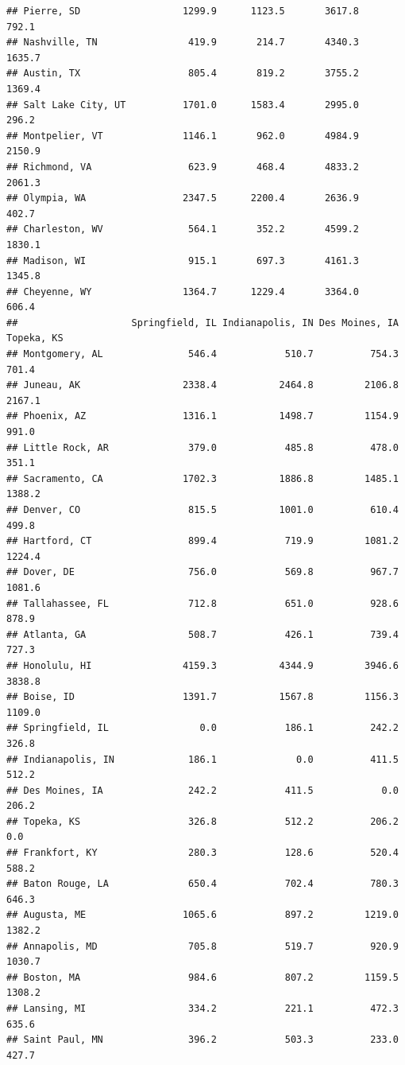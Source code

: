 \documentclass[
]{article}
\begin{document}
\begin{verbatim}
## Pierre, SD                  1299.9      1123.5       3617.8     792.1
## Nashville, TN                419.9       214.7       4340.3    1635.7
## Austin, TX                   805.4       819.2       3755.2    1369.4
## Salt Lake City, UT          1701.0      1583.4       2995.0     296.2
## Montpelier, VT              1146.1       962.0       4984.9    2150.9
## Richmond, VA                 623.9       468.4       4833.2    2061.3
## Olympia, WA                 2347.5      2200.4       2636.9     402.7
## Charleston, WV               564.1       352.2       4599.2    1830.1
## Madison, WI                  915.1       697.3       4161.3    1345.8
## Cheyenne, WY                1364.7      1229.4       3364.0     606.4
##                    Springfield, IL Indianapolis, IN Des Moines, IA Topeka, KS
## Montgomery, AL               546.4            510.7          754.3      701.4
## Juneau, AK                  2338.4           2464.8         2106.8     2167.1
## Phoenix, AZ                 1316.1           1498.7         1154.9      991.0
## Little Rock, AR              379.0            485.8          478.0      351.1
## Sacramento, CA              1702.3           1886.8         1485.1     1388.2
## Denver, CO                   815.5           1001.0          610.4      499.8
## Hartford, CT                 899.4            719.9         1081.2     1224.4
## Dover, DE                    756.0            569.8          967.7     1081.6
## Tallahassee, FL              712.8            651.0          928.6      878.9
## Atlanta, GA                  508.7            426.1          739.4      727.3
## Honolulu, HI                4159.3           4344.9         3946.6     3838.8
## Boise, ID                   1391.7           1567.8         1156.3     1109.0
## Springfield, IL                0.0            186.1          242.2      326.8
## Indianapolis, IN             186.1              0.0          411.5      512.2
## Des Moines, IA               242.2            411.5            0.0      206.2
## Topeka, KS                   326.8            512.2          206.2        0.0
## Frankfort, KY                280.3            128.6          520.4      588.2
## Baton Rouge, LA              650.4            702.4          780.3      646.3
## Augusta, ME                 1065.6            897.2         1219.0     1382.2
## Annapolis, MD                705.8            519.7          920.9     1030.7
## Boston, MA                   984.6            807.2         1159.5     1308.2
## Lansing, MI                  334.2            221.1          472.3      635.6
## Saint Paul, MN               396.2            503.3          233.0      427.7

\end{verbatim}
\end{document}

